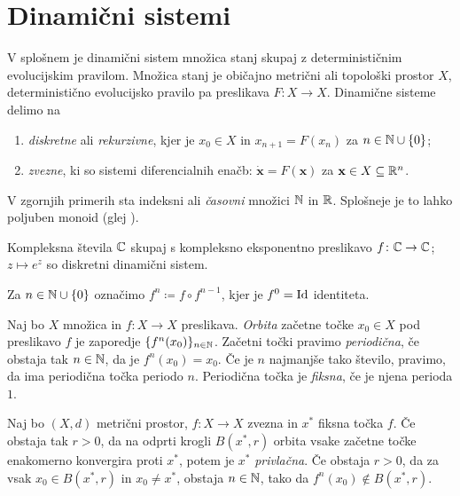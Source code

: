 \section{Dinamični sistemi} \label{sec:dis}

V splošnem je dinamični sistem množica stanj skupaj z determinističnim evolucijskim pravilom. Množica stanj je običajno metrični ali topološki prostor \(X\), deterministično evolucijsko pravilo pa preslikava \(F \colon X \to X\). Dinamične sisteme delimo na

\begin{enumerate}
    \item \emph{diskretne} ali \emph{rekurzivne}, kjer je \(x_0 \in X\) in \(x_{n + 1} = F (x_n)\) za \(n \in \mathbb N \cup \{0\}\);
    \item \emph{zvezne}, ki so sistemi diferencialnih enačb: \(\dot{\mathbf{x}} = F (\mathbf{x})\) za \(\mathbf{x} \in X \subseteq \mathbb R^n\).
\end{enumerate}

\noindent V zgornjih primerih sta indeksni ali \emph{časovni} množici \(\mathbb N\) in \(\mathbb R\). Splošneje je to lahko poljuben monoid (glej \cite{Giunti_2012}).

\begin{zgled}
    Kompleksna števila \(\mathbb C\) skupaj s kompleksno eksponentno preslikavo \(f \colon \mathbb C \to \mathbb C\); \(z \mapsto e^{z}\) so diskretni dinamični sistem.
\end{zgled}

\noindent Za \(n \in \mathbb N \cup \{0\}\) označimo \(f^n \coloneq f \circ f^{n - 1}\), kjer je \(f^0 = \operatorname{Id}\) identiteta.

\begin{definicija}
    Naj bo \(X\) množica in \(f \colon X \to X\) preslikava. \emph{Orbita} začetne točke \(x_0 \in X\) pod preslikavo \(f\) je zaporedje \(\{f^n (x_0)\}_{n \in \mathbb N}\). Začetni točki pravimo \emph{periodična}, če obstaja tak \(n \in \mathbb N\), da je \(f^n (x_0) = x_0\). Če je \(n\) najmanjše tako število, pravimo, da ima periodična točka periodo \(n\). Periodična točka je \emph{fiksna}, če je njena perioda \(\num{1}\).
\end{definicija}

\begin{definicija}
    Naj bo \((X, d)\) metrični prostor, \(f \colon X \to X\) zvezna in \(x^*\) fiksna točka \(f\). Če obstaja tak \(r > 0\), da na odprti krogli \(B (x^*, r)\) orbita vsake začetne točke enakomerno konvergira proti \(x^*\), potem je \(x^*\) \emph{privlačna}. Če obstaja \(r > 0\), da za vsak \(x_0 \in B (x^*, r)\) in \(x_0 \neq x^*\), obstaja \(n \in \mathbb N\), tako da \(f^n (x_0) \notin B (x^*, r)\).
\end{definicija}

